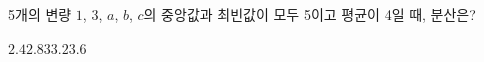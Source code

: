 5개의 변량 $1$, $3$, $a$, $b$, $c$의 중앙값과 최빈값이 모두 5이고 평균이 4일 때, 분산은?
\begin{choices32}{$2.4$}{$2.8$}{$3$}{$3.2$}{$3.6$}\end{choices32}
